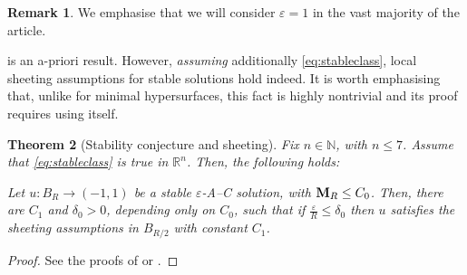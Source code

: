\documentclass{article}
\newcommand{\N}{\mathbb{N}}
\newcommand{\R}{\mathbb{R}}
\newcommand{\ep}{\varepsilon}
\newtheorem{theorem}{Theorem}[section]
\theoremstyle{definition}
\newtheorem{remark}[theorem]{Remark}
\begin{document}
\begin{remark}
    We emphasise that we will consider $\ep=1$ in the vast majority of the article.
\end{remark}
 is an a-priori result. However, \textit{assuming} additionally \eqref{eq:stableclass}, local sheeting assumptions for stable solutions hold indeed. It is worth emphasising that, unlike for minimal hypersurfaces, this fact is highly nontrivial and its proof requires using  itself.
\begin{theorem}[Stability conjecture and sheeting]\label{thm:sheetstabconj}
    Fix $n\in\N$, with $n\leq 7$. Assume that \eqref{eq:stableclass} is true in $\R^n$. Then, the following holds:

    Let $u:B_{R}\to(-1,1)$ be a stable $\ep$-A--C solution, with ${\bf M}_{R}\leq C_0$. Then, there are $C_1$ and $\delta_0>0$, depending only on $C_0$, such that if $\frac{\ep}{R}\leq \delta_0$ then $u$ satisfies the sheeting assumptions in $B_{R/2}$ with constant $C_1$.
\end{theorem}
\begin{proof}
    See the proofs of \cite[Theorem 1.4]{FSstable} or \cite[Corollary 1.3]{WW19}.
\end{proof}
\end{document}
